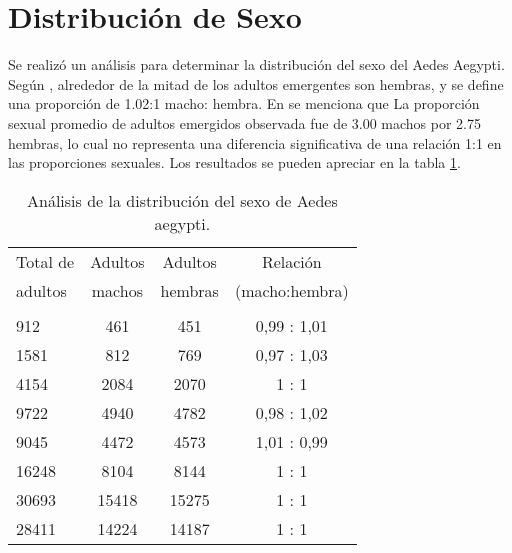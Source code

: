 \section{Distribución de Sexo}
Se realizó un análisis para determinar la distribución del sexo del Aedes Aegypti. Según 
\cite{otero2006stochastic}, alrededor de la mitad de los adultos emergentes son hembras, 
y se define una proporción de 1.02:1 macho: hembra. En \cite{manrique1998desarrollo} se menciona que
La proporción sexual promedio de adultos emergidos observada fue de 3.00 machos por 2.75 hembras, lo cual
no representa una diferencia significativa de una relación 1:1 en las proporciones sexuales. Los
resultados se pueden apreciar en la tabla \ref{tab:distribucion-sexo-test}.

\begin{table}
    \begin{center}
        \begin{tabular}{p{3cm} c c c }
            Total de & Adultos & Adultos & Relación \\
            adultos  & machos  & hembras & (macho:hembra) \\
            \hline\\
            912    &  461    &  451    &  0,99 : 1,01 \\
            1581   &  812    &  769    &  0,97 : 1,03 \\
            4154   &  2084   &  2070   &  1    : 1 \\
            9722   &  4940   &  4782   &  0,98 : 1,02 \\
            9045   &  4472   &  4573   &  1,01 : 0,99 \\
            16248  &  8104   &  8144   &  1    : 1 \\
            30693  &  15418  &  15275  &  1    : 1 \\
            28411  &  14224  &  14187  &  1    : 1 \\
        \end{tabular}
    \caption{ \label{tab:distribucion-sexo-test} Análisis de la distribución del sexo de Aedes aegypti.}
    \end{center}
\end{table}

